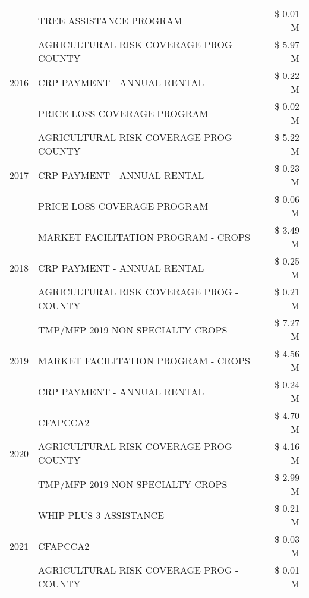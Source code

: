 \begin{tabular}{llr}
 & TREE ASSISTANCE PROGRAM & \$ 0.01 M \\
\cline{1-3}
\multirow[t]{3}{*}{2016} & AGRICULTURAL RISK COVERAGE PROG - COUNTY & \$ 5.97 M \\
 & CRP PAYMENT - ANNUAL RENTAL & \$ 0.22 M \\
 & PRICE LOSS COVERAGE PROGRAM & \$ 0.02 M \\
\cline{1-3}
\multirow[t]{3}{*}{2017} & AGRICULTURAL RISK COVERAGE PROG - COUNTY & \$ 5.22 M \\
 & CRP PAYMENT - ANNUAL RENTAL & \$ 0.23 M \\
 & PRICE LOSS COVERAGE PROGRAM & \$ 0.06 M \\
\cline{1-3}
\multirow[t]{3}{*}{2018} & MARKET FACILITATION PROGRAM - CROPS & \$ 3.49 M \\
 & CRP PAYMENT - ANNUAL RENTAL & \$ 0.25 M \\
 & AGRICULTURAL RISK COVERAGE PROG - COUNTY & \$ 0.21 M \\
\cline{1-3}
\multirow[t]{3}{*}{2019} & TMP/MFP 2019 NON SPECIALTY CROPS & \$ 7.27 M \\
 & MARKET FACILITATION PROGRAM - CROPS & \$ 4.56 M \\
 & CRP PAYMENT - ANNUAL RENTAL & \$ 0.24 M \\
\cline{1-3}
\multirow[t]{3}{*}{2020} & CFAPCCA2 & \$ 4.70 M \\
 & AGRICULTURAL RISK COVERAGE PROG - COUNTY & \$ 4.16 M \\
 & TMP/MFP 2019 NON SPECIALTY CROPS & \$ 2.99 M \\
\cline{1-3}
\multirow[t]{3}{*}{2021} & WHIP PLUS 3 ASSISTANCE & \$ 0.21 M \\
 & CFAPCCA2 & \$ 0.03 M \\
 & AGRICULTURAL RISK COVERAGE PROG - COUNTY & \$ 0.01 M \\
\cline{1-3}
\bottomrule
\end{tabular}
